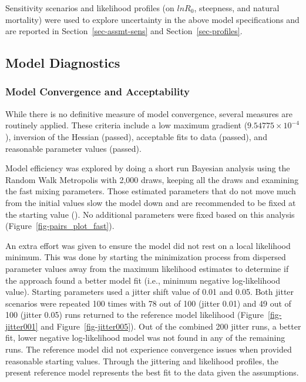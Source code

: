 \documentclass[
  english,
]{article}
\begin{document}
Sensitivity scenarios and likelihood profiles (on \(lnR_0\), steepness,
and natural mortality) were used to explore uncertainty in the above
model specifications and are reported in Section~\ref{sec-assmt-sens}
and Section~\ref{sec-profiles}.

\newpage{}

\subsection{Model Diagnostics}\label{model-diagnostics}

\subsubsection{Model Convergence and
Acceptability}\label{sec-model-convergence}

While there is no definitive measure of model convergence, several
measures are routinely applied. These criteria include a low maximum
gradient (\ensuremath{9.54775\times 10^{-4}}), inversion of the Hessian
(passed), acceptable fits to data (passed), and reasonable parameter
values (passed).

Model efficiency was explored by doing a short run Bayesian analysis
using the Random Walk Metropolis with 2,000 draws, keeping all the draws
and examining the fast mixing parameters. Those estimated parameters
that do not move much from the initial values slow the model down and
are recommended to be fixed at the starting value
(). No
additional parameters were fixed based on this analysis
(Figure~\ref{fig-pairs_plot_fast}).

An extra effort was given to ensure the model did not rest on a local
likelihood minimum. This was done by starting the minimization process
from dispersed parameter values away from the maximum likelihood
estimates to determine if the approach found a better model fit (i.e.,
minimum negative log-likelihood value). Starting parameters used a
jitter shift value of 0.01 and 0.05. Both jitter scenarios were repeated
100 times with 78 out of 100 (jitter 0.01) and 49 out of 100 (jitter
0.05) runs returned to the reference model likelihood
(Figure~\ref{fig-jitter001} and Figure~\ref{fig-jitter005}). Out of the
combined 200 jitter runs, a better fit, lower negative log-likelihood
model was not found in any of the remaining runs. The reference model
did not experience convergence issues when provided reasonable starting
values. Through the jittering and likelihood profiles, the present
reference model represents the best fit to the data given the
assumptions.
\end{document}

